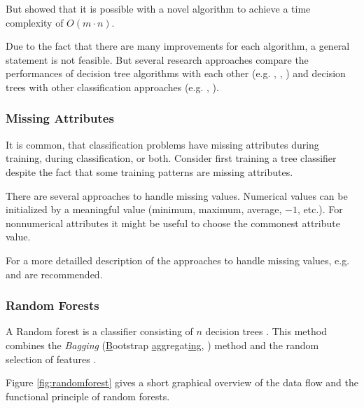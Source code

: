 But \cite{su2006fast} showed that it is possible with a novel algorithm to achieve a time complexity of $O(m \cdot n)$.  


Due to the fact that there are many improvements for each algorithm, a general statement is not feasible. But several research approaches compare the performances of decision tree algorithms with each other (e.g. \cite{lavanya2011performance}, \cite{banfield2007comparison}, \cite{safavian1991survey}) and decision trees with other classification approaches (e.g. \cite{huang2003comparing}, \cite{curram1994neural}). 



\subsubsection{Missing Attributes}\label{missingattributes}

It is common, that classification problems have missing attributes during training, during classification, or both. Consider first training a tree classifier despite the fact that some training patterns are missing attributes. 

There are several approaches to handle missing values. Numerical values can be initialized by a meaningful value (minimum, maximum, average, $-1$, etc.). For nonnumerical attributes it might be useful to choose the commonest attribute value. 

For a more detailled description of the approaches to handle missing values, e.g. \cite{zhang2005missing} and \cite[p. 59 ff.]{rokach2008data} are recommended.


\subsubsection{Random Forests}

A Random forest is a classifier consisting of $n$ decision trees \cite{tong2003decision}. This method combines the \textit{Bagging} (\underline{B}ootstrap \underline{agg}regat\underline{ing}, \cite[p. 105ff.]{rokach2008data}) method and the random selection of features \cite[p. 87 ff.]{rokach2008data}. 

Figure \ref{fig:randomforest} gives a short graphical overview of the data flow and the functional principle of random forests.
 

